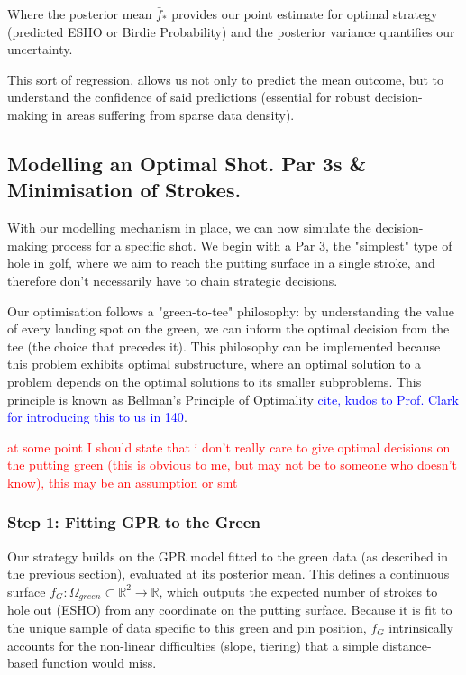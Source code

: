 \documentclass[11pt, letterpaper]{article}
\begin{document}
Where the posterior mean $\bar f_*$ provides our point estimate for optimal strategy (predicted ESHO or Birdie Probability) and the posterior variance quantifies our uncertainty.

This sort of regression, allows us not only to predict the mean outcome, but to understand the confidence of said predictions (essential for robust decision-making in areas suffering from sparse data density).

\subsection{Modelling an Optimal Shot. Par 3s \& Minimisation of Strokes.}

With our modelling mechanism in place, we can now simulate the decision-making process for a specific shot. We begin with a  Par 3, the "simplest" type of hole in golf, where we aim to reach the putting surface in a single stroke, and therefore don't necessarily have to chain strategic decisions. 

Our optimisation follows a "green-to-tee" philosophy: by understanding the value of every landing spot on the green, we can inform the optimal decision from the tee (the choice that precedes it). This philosophy can be implemented because this problem exhibits optimal substructure, where an optimal solution to a problem depends on the optimal solutions to its smaller subproblems. This principle is known as Bellman's Principle of Optimality \textcolor{blue}{cite, kudos to Prof. Clark for introducing this to us in 140}.

\textcolor{red}{at some point I should state that i don't really care to give optimal decisions on the putting green (this is obvious to me, but may not be to someone who doesn't know), this may be an assumption or smt}

\subsubsection{Step 1: Fitting GPR to the Green}
Our strategy builds on the GPR model fitted to the green data (as described in the previous section), evaluated at its posterior mean. This defines a continuous surface $f_G: \Omega_{green} \subset \mathbb{R}^2 \to \mathbb{R}$, which outputs the expected number of strokes to hole out (ESHO) from any coordinate on the putting surface. Because it is fit to the unique sample of data specific to this green and pin position, $f_G$ intrinsically accounts for the non-linear difficulties (slope, tiering) that a simple distance-based function would miss.
\end{document}
